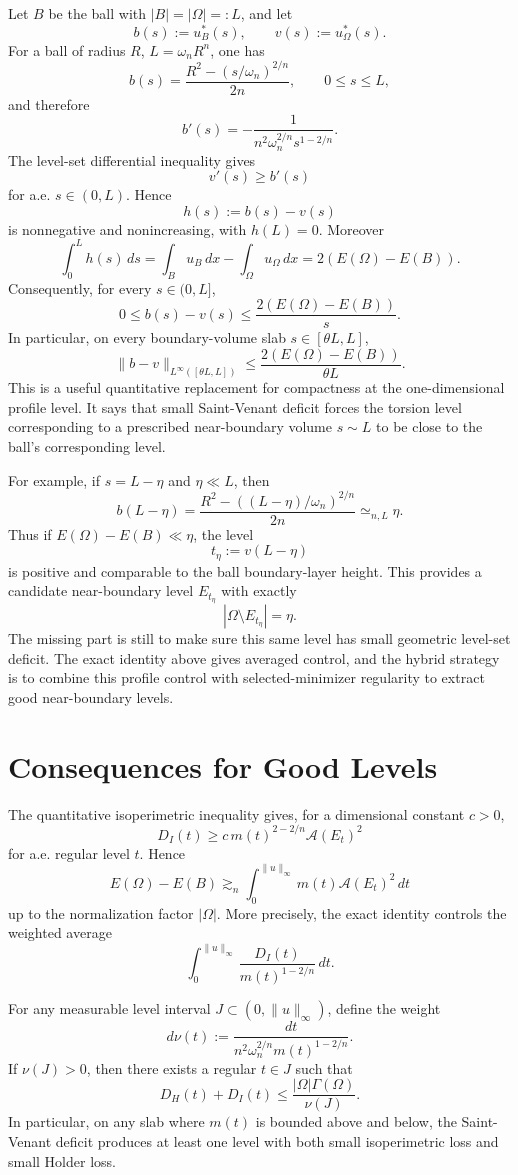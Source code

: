 \documentclass[11pt]{article}
\begin{document}
Let \(B\) be the ball with \(|B|=|\Omega|=:L\), and let
\[
b(s):=u_B^*(s),\qquad v(s):=u_\Omega^*(s).
\]
For a ball of radius \(R\), \(L=\omega_n R^n\), one has
\[
b(s)=\frac{R^2-(s/\omega_n)^{2/n}}{2n},
\qquad 0\le s\le L,
\]
and therefore
\[
b'(s)=-\frac{1}{n^2\omega_n^{2/n}s^{1-2/n}}.
\]
The level-set differential inequality gives
\[
v'(s)\ge b'(s)
\]
for a.e. \(s\in(0,L)\). Hence
\[
h(s):=b(s)-v(s)
\]
is nonnegative and nonincreasing, with \(h(L)=0\). Moreover
\[
\int_0^L h(s)\,ds
=
\int_B u_B\,dx-\int_\Omega u_\Omega\,dx
=
2(E(\Omega)-E(B)).
\]
Consequently, for every \(s\in(0,L]\),
\[
0\le b(s)-v(s)
\le
\frac{2(E(\Omega)-E(B))}{s}.
\]
In particular, on every boundary-volume slab \(s\in[\theta L,L]\),
\[
\|b-v\|_{L^\infty([\theta L,L])}
\le
\frac{2(E(\Omega)-E(B))}{\theta L}.
\]
This is a useful quantitative replacement for compactness at the one-dimensional
profile level. It says that small Saint-Venant deficit forces the torsion level
corresponding to a prescribed near-boundary volume \(s\sim L\) to be close to the
ball's corresponding level.

For example, if \(s=L-\eta\) and \(\eta\ll L\), then
\[
b(L-\eta)
=
\frac{R^2-((L-\eta)/\omega_n)^{2/n}}{2n}
\simeq_{n,L}\eta.
\]
Thus if \(E(\Omega)-E(B)\ll \eta\), the level
\[
t_\eta:=v(L-\eta)
\]
is positive and comparable to the ball boundary-layer height. This provides a
candidate near-boundary level \(E_{t_\eta}\) with exactly
\[
|\Omega\setminus E_{t_\eta}|=\eta.
\]
The missing part is still to make sure this same level has small geometric
level-set deficit. The exact identity above gives averaged control, and the
hybrid strategy is to combine this profile control with selected-minimizer
regularity to extract good near-boundary levels.

\section{Consequences for Good Levels}

The quantitative isoperimetric inequality gives, for a dimensional constant
\(c>0\),
\[
D_I(t)
\ge
c\,m(t)^{2-2/n}\mathcal A(E_t)^2
\]
for a.e. regular level \(t\). Hence
\[
E(\Omega)-E(B)
\gtrsim_n
\int_0^{\|u\|_\infty}
m(t)\mathcal A(E_t)^2\,dt
\]
up to the normalization factor \(|\Omega|\). More precisely, the exact identity
controls the weighted average
\[
\int_0^{\|u\|_\infty}
\frac{D_I(t)}
{m(t)^{1-2/n}}\,dt.
\]

For any measurable level interval \(J\subset(0,\|u\|_\infty)\), define the
weight
\[
d\nu(t)
:=
\frac{dt}{n^2\omega_n^{2/n}m(t)^{1-2/n}}.
\]
If \(\nu(J)>0\), then there exists a regular \(t\in J\) such that
\[
D_H(t)+D_I(t)
\le
\frac{|\Omega|\Gamma(\Omega)}{\nu(J)}.
\]
In particular, on any slab where \(m(t)\) is bounded above and below, the
Saint-Venant deficit produces at least one level with both small isoperimetric
loss and small Holder loss.
\end{document}
